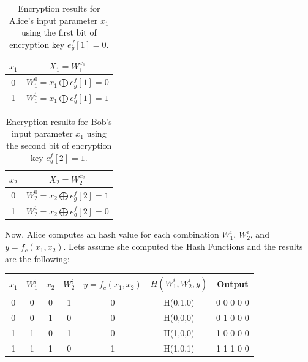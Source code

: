 \begin{refsection}
\begin{table}[H]
\centering
\begin{tabular}{|c|c|}
\hline
$x_1$           & $X_1 = W_1^{x_1}$                             \\ \hline
0               & $W_1^0=x_1 \bigoplus e_g^f[1] = 0$                   \\ \hline
1               & $W_1^1=x_1 \bigoplus e_g^f[1] = 1$                   \\ \hline
\end{tabular}
\caption{Encryption results for Alice's input parameter $x_1$ using the first bit of encryption key $e_g^f[1]=0$.} \label{tb:aliceinputs}
\end{table}

\begin{table}[H]
\centering
\begin{tabular}{|c|c|}
\hline
$x_2$           & $X_2 = W_2^{x_2}$                             \\ \hline
0               & $W_2^0=x_2 \bigoplus e_g^f[2] = 1$                   \\ \hline
1               & $W_2^1=x_2 \bigoplus e_g^f[2] = 0$                   \\ \hline
\end{tabular}
\caption{Encryption results for Bob's input parameter $x_1$ using the second bit of encryption key $e_g^f[2]=1$.} \label{tb:bobinputs}
\end{table}
Now, Alice computes an hash value for each combination $W_1^i$, $W_2^i$, and $y=f_c(x_1, x_2)$.
Lets assume she computed the Hash Functions and the results are the following:

\begin{table}[H]
    \centering
    \begin{tabular}{|c|c|c|c|c|c|c|}
    \hline
    $x_1$       & $W_1^i$       & $x_2$         & $W_2^i$   &     $y=f_c(x_1, x_2)$     &    $H(W_1^i,W_2^i, y)$    &    Output                             \\ \hline
    0           & 0             & 0             & 1         &  0                        & H(0,1,0)                  & 0 0 0 0 0                             \\ \hline
    0           & 0             & 1             & 0         &  0                        & H(0,0,0)                  & 0 1 0 0 0                             \\ \hline
    1           & 1             & 0             & 1         &  0                        & H(1,0,0)                  & 1 0 0 0 0                             \\ \hline
    1           & 1             & 1             & 0         &  1                        & H(1,0,1)                  & 1 1 1 0 0                             \\ \hline


\end{tabular}
\end{table}
\end{refsection}
